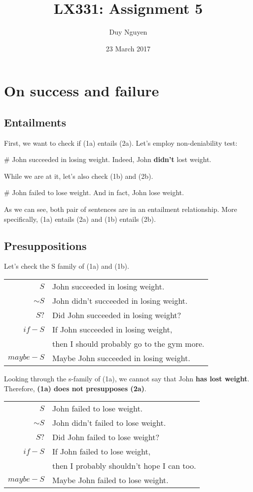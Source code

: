 \documentclass{article}
\title{LX331: Assignment 5}
\author{Duy Nguyen}
\date{23 March 2017}
\begin{document}
\maketitle
\section{On success and failure}
\subsection{Entailments}
First, we want to check if (1a) entails (2a). Let's employ non-deniability test:

\# John succeeded in losing weight. Indeed, John \textbf{didn't} lost weight.

While we are at it, let's also check (1b) and (2b). 

\# John failed to lose weight. And in fact, John lose weight. 

As we can see, both pair of sentences are in an entailment relationship. More specifically, (1a) entails (2a) and (1b) entails (2b).

\subsection{Presuppositions}

Let's check the S family of (1a) and (1b).

\begin{center}
\begin{tabular}{r|l}
    $S$         & John succeeded in losing weight.  \\
    $\sim S$    & John didn't succeeded in losing weight.  \\
    $S?$        & Did John succeeded in losing weight?  \\
    $if-S$      & If John succeeded in losing weight,   \\
                & then I should probably go to the gym more.  \\
    $maybe-S$   & Maybe John succeeded in losing weight.  \\
\end{tabular}
\end{center}

Looking through the s-family of (1a), we cannot say that John \textbf{has lost weight}. Therefore, \textbf{(1a) does not presupposes (2a)}.

\begin{center}
\begin{tabular}{r|l}
    $S$         & John failed to lose weight. \\
    $\sim S$    & John didn't failed to lose weight. \\
    $S?$        & Did John failed to lose weight? \\
    $if-S$      & If John failed to lose weight,  \\
                & then I probably shouldn't hope I can too. \\
    $maybe-S$   & Maybe John failed to lose weight. \\
\end{tabular}
\end{center}
\end{document}
